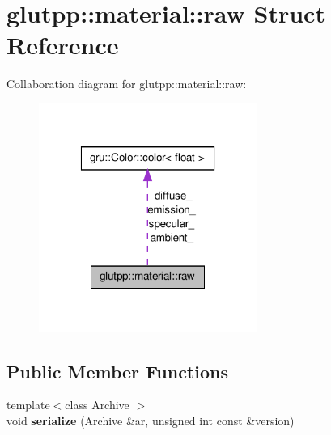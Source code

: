 \hypertarget{structglutpp_1_1material_1_1raw}{\section{glutpp\-:\-:material\-:\-:raw \-Struct \-Reference}
\label{structglutpp_1_1material_1_1raw}
}


\-Collaboration diagram for glutpp\-:\-:material\-:\-:raw\-:
\nopagebreak
\begin{figure}[H]
\begin{center}
\leavevmode
\includegraphics[width=202pt]{structglutpp_1_1material_1_1raw__coll__graph}
\end{center}
\end{figure}
\subsection*{\-Public \-Member \-Functions}
\begin{DoxyCompactItemize}
\item 
\hypertarget{structglutpp_1_1material_1_1raw_a3062e16f1da2217db62fa54b30f2d2e2}{{\footnotesize template$<$class Archive $>$ }\\void {\bfseries serialize} (\-Archive \&ar, unsigned int const \&version)}\label{structglutpp_1_1material_1_1raw_a3062e16f1da2217db62fa54b30f2d2e2}

\end{DoxyCompactItemize}
